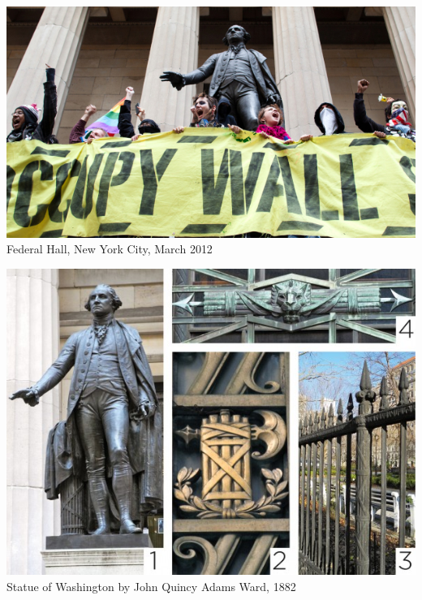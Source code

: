 
\begin{frame}
    \centering
    \includegraphics[width=.9\textwidth]{img/fasces/ows.jpg} \\
    Federal Hall, New York City, March 2012 \\
\end{frame}
\begin{frame}
    \centering
    \includegraphics[width=.9\textwidth]{img/fasces/fasces-stuff.jpg} \\
    Statue of Washington by John Quincy Adams Ward, 1882 \\
\end{frame}

